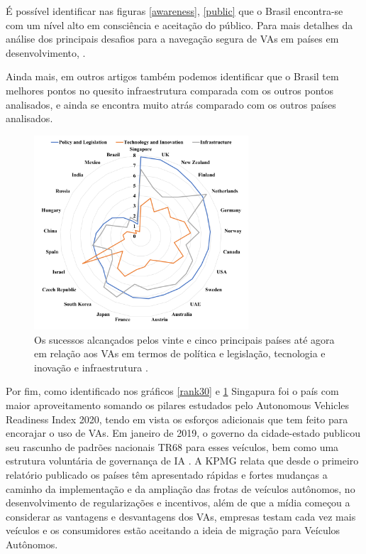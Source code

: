 É possível identificar nas figuras \ref{awareness}, \ref{public} que o Brasil encontra-se com um nível alto em consciência e aceitação do público. Para mais detalhes da análise dos principais desafios para a navegação segura de VAs em países em desenvolvimento, \cite{mundobrasil}.

Ainda mais, em outros artigos também podemos identificar que o Brasil tem melhores pontos no quesito infraestrutura comparada com os outros pontos analisados, e ainda se encontra muito atrás comparado com os outros países analisados.
\begin{figure}[H]
\centering
\includegraphics[width=8cm]{Figures/future.png}
\caption{Os sucessos alcançados pelos vinte e cinco principais países até agora em relação aos VAs em termos de política e legislação, tecnologia e inovação e infraestrutura \cite{future-view}.}
\label{figura_future-view}
\end{figure}



Por fim, como identificado nos gráficos \ref{rank30} e \ref{figura_future-view} Singapura foi o país com maior aproveitamento somando os pilares estudados pelo Autonomous Vehicles Readiness Index 2020, tendo em vista os esforços adicionais que tem feito para encorajar o uso de VAs. Em janeiro de 2019, o governo da cidade-estado publicou seu rascunho de padrões nacionais TR68 para esses veículos, bem como uma estrutura voluntária de governança de IA \cite{KPMG}. A KPMG relata que desde o primeiro relatório publicado os países têm apresentado rápidas e fortes mudanças a caminho da implementação e da ampliação das frotas de veículos autônomos, no desenvolvimento de regularizações e incentivos, além de que a mídia começou a considerar as vantagens e desvantagens dos VAs, empresas testam cada vez mais veículos e os consumidores estão aceitando a ideia de migração para Veículos Autônomos.

